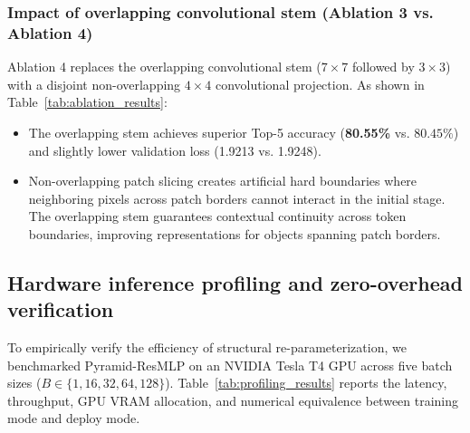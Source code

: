 \subsubsection{Impact of overlapping convolutional stem (Ablation 3 vs. Ablation 4)}
Ablation 4 replaces the overlapping convolutional stem ($7 \times 7$ followed by $3 \times 3$) with a disjoint non-overlapping $4 \times 4$ convolutional projection. As shown in Table~\ref{tab:ablation_results}:
\begin{itemize}
    \item The overlapping stem achieves superior Top-5 accuracy (\textbf{80.55\%} vs. $80.45\%$) and slightly lower validation loss (1.9213 vs. 1.9248).
    \item Non-overlapping patch slicing creates artificial hard boundaries where neighboring pixels across patch borders cannot interact in the initial stage. The overlapping stem guarantees contextual continuity across token boundaries, improving representations for objects spanning patch borders.
\end{itemize}

\subsection{Hardware inference profiling and zero-overhead verification}
\label{subsection:hardware_profiling}

To empirically verify the efficiency of structural re-parameterization, we benchmarked Pyramid-ResMLP on an NVIDIA Tesla T4 GPU across five batch sizes ($B \in \{1, 16, 32, 64, 128\}$). Table~\ref{tab:profiling_results} reports the latency, throughput, GPU VRAM allocation, and numerical equivalence between training mode and deploy mode.

